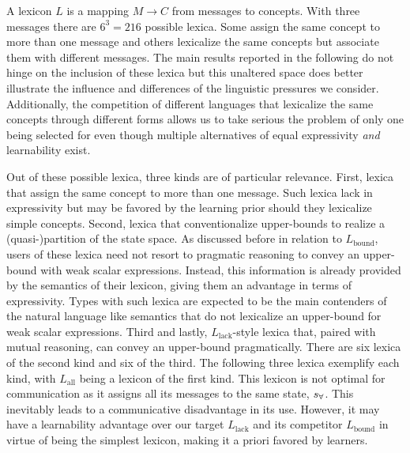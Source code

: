 \documentclass[a4paper]{article}
\newcommand{\state}{\ensuremath{s}\xspace}		%
\newcommand{\mystate}[1]{\ensuremath{\state_{\text{#1}}}\xspace} %
\newcommand{\mylang}[1]{\ensuremath{L_{\text{#1}}}\xspace} %
\newcommand{\Messgs}{\ensuremath{M}\xspace}		%
\newcommand{\sall}{\mystate{\ensuremath{\forall}}}
\newcommand{\Lall}{\mylang{all}}
\newcommand{\Lbound}{\mylang{bound}}
\newcommand{\Llack}{\mylang{lack}}
\begin{document}
A lexicon $L$ is a mapping $\Messgs \rightarrow C$ from messages to concepts. With three
messages there are $6^3 = 216$ possible lexica. Some assign the same concept to more than one message and others lexicalize the same concepts but associate them with different messages. The main results reported in the following do not hinge on the inclusion of these lexica but this unaltered space does better illustrate the influence and differences of the linguistic pressures we consider. Additionally, the competition of different languages that lexicalize the same concepts through different forms allows us to take serious the problem of only one being selected for even though multiple alternatives of equal expressivity {\em and} learnability exist.

Out of these possible lexica, three kinds are of particular relevance. First, lexica that assign the same concept to more than one message. Such lexica lack in expressivity but may be favored by the learning prior should they lexicalize simple concepts. Second, lexica that conventionalize upper-bounds to realize a (quasi-)partition of the state space. As discussed before in relation to $\Lbound$, users of these lexica need not resort to pragmatic reasoning to convey an upper-bound with weak scalar expressions. Instead, this information is already provided by the semantics of their lexicon, giving them an advantage in terms of expressivity. Types with such lexica are expected to be the main contenders of the natural language like semantics that do not lexicalize an upper-bound for weak scalar expressions. Third and lastly, $\Llack$-style lexica that, paired with mutual reasoning, can convey an upper-bound pragmatically. There are six lexica of the second kind and six of the third. The following three lexica exemplify each kind, with $\Lall$ being a lexicon of the first kind. This lexicon is not optimal for communication as it assigns all its messages to the same state, $\sall$. This inevitably leads to a communicative disadvantage in its use. However, it may have a learnability advantage over our target $\Llack$ and its competitor $\Lbound$ in virtue of being the simplest lexicon, making it a priori favored by learners.
\end{document}
